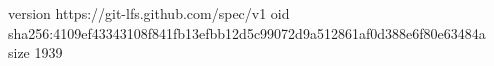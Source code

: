 version https://git-lfs.github.com/spec/v1
oid sha256:4109ef43343108f841fb13efbb12d5c99072d9a512861af0d388e6f80e63484a
size 1939

